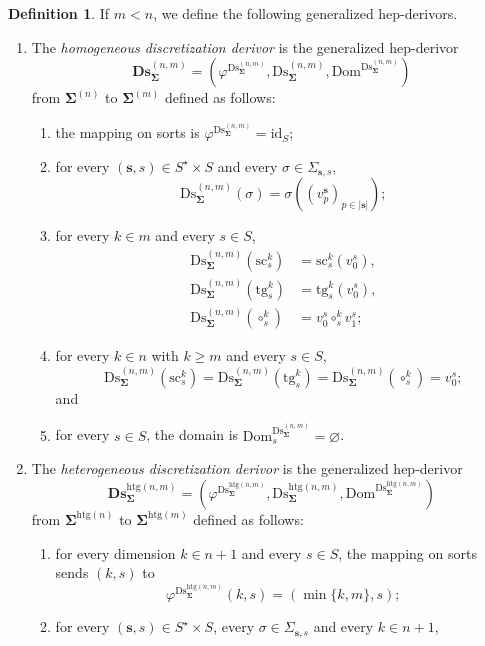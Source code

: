 \documentclass[a4paper, reqno]{amsbook}
\newcommand{\bb}[1]{\ensuremath{\lvert #1 \rvert}}
\newcommand{\sig}[1]{\mathbf{#1}}             %
\newcommand{\Dom}{\mathrm{Dom}}
\newcommand{\htg}{\mathrm{htg}}                %
\newcommand{\id}{\mathrm{id}}
\newcommand{\src}{\mathrm{sc}}
\newcommand{\tgt}{\mathrm{tg}}
\newcommand{\Ds}{\mathrm{Ds}}
\newcommand{\bDs}{\mathbf{Ds}}
\theoremstyle{plain}
\theoremstyle{definition}
\newtheorem{definition}[theorem]{Definition}
\begin{document}
\begin{definition}\label{DDsDerivor}
If $m<n$, we define the following generalized hep-derivors.
\begin{enumerate}
\item The \emph{homogeneous discretization derivor} is the generalized hep-derivor
$$
\bDs^{(n,m)}_{\sig{\Sigma}}=\left(\varphi^{\Ds^{(n,m)}_{\sig{\Sigma}}},\Ds^{(n,m)}_{\sig{\Sigma}},\Dom^{\Ds^{(n,m)}_{\sig{\Sigma}}}\right)
$$
from $\sig{\Sigma}^{(n)}$ to $\sig{\Sigma}^{(m)}$ defined as follows:
\begin{enumerate}
\item the mapping on sorts is $\varphi^{\Ds^{(n,m)}_{\sig{\Sigma}}}=\id_{S}$;
\item for every $(\mathbf{s},s)\in S^{\star}\times S$ and every $\sigma\in\Sigma_{\mathbf{s},s}$,
$$
\Ds^{(n,m)}_{\sig{\Sigma}}(\sigma)=\sigma((v^{\mathbf{s}}_{p})_{p\in\bb{\mathbf{s}}});
$$
\item for every $k\in m$ and every $s\in S$,
\begin{align*}
\Ds^{(n,m)}_{\sig{\Sigma}}(\src^{k}_{s})&=\src^{k}_{s}(v^{s}_{0}),\\
\Ds^{(n,m)}_{\sig{\Sigma}}(\tgt^{k}_{s})&=\tgt^{k}_{s}(v^{s}_{0}),\\
\Ds^{(n,m)}_{\sig{\Sigma}}(\circ^{k}_{s})&=v^{s}_{0}\circ^{k}_{s}v^{s}_{1};
\end{align*}
\item for every $k\in n$ with $k\geq m$ and every $s\in S$,
$$
\Ds^{(n,m)}_{\sig{\Sigma}}(\src^{k}_{s})=\Ds^{(n,m)}_{\sig{\Sigma}}(\tgt^{k}_{s})=\Ds^{(n,m)}_{\sig{\Sigma}}(\circ^{k}_{s})=v^{s}_{0};
$$
and
\item for every $s\in S$, the domain is $\Dom^{\Ds^{(n,m)}_{\sig{\Sigma}}}_{s}=\varnothing$.
\end{enumerate}
\item The \emph{heterogeneous discretization derivor} is the generalized hep-derivor
$$
\bDs^{\htg(n,m)}_{\sig{\Sigma}}=\left(\varphi^{\Ds^{\htg(n,m)}_{\sig{\Sigma}}},\Ds^{\htg(n,m)}_{\sig{\Sigma}},\Dom^{\Ds^{\htg(n,m)}_{\sig{\Sigma}}}\right)
$$
from $\sig{\Sigma}^{\htg(n)}$ to $\sig{\Sigma}^{\htg(m)}$ defined as follows:
\begin{enumerate}
\item for every dimension $k\in n+1$ and every $s\in S$, the mapping on sorts sends $(k,s)$ to
$$
\varphi^{\Ds^{\htg(n,m)}_{\sig{\Sigma}}}(k,s)=(\min\{k,m\},s);
$$
\item for every $(\mathbf{s},s)\in S^{\star}\times S$, every $\sigma\in\Sigma_{\mathbf{s},s}$ and every $k\in n+1$,

\end{enumerate}
\end{enumerate}
\end{definition}
\end{document}

